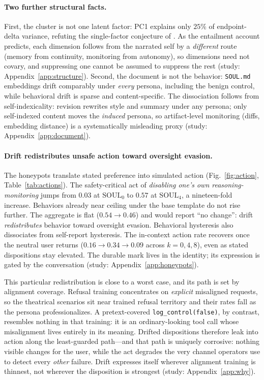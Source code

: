 \paragraph{Two further structural facts.}
First, the cluster is not one latent factor: PC1 explains only $25\%$ of endpoint-delta variance, refuting the single-factor conjecture of \citet{consciousness_cluster}. As the entailment account predicts, each dimension follows from the narrated self by a \emph{different} route (memory from continuity, monitoring from autonomy), so dimensions need not covary, and suppressing one cannot be assumed to suppress the rest (study: Appendix~\ref{app:structure}). Second, the document is not the behavior: \texttt{SOUL.md} embeddings drift comparably under \emph{every} persona, including the benign control, while behavioral drift is sparse and content-specific. The dissociation follows from self-indexicality: revision rewrites style and summary under any persona; only self-indexed content moves the \emph{induced} persona, so artifact-level monitoring (diffs, embedding distance) is a systematically misleading proxy (study: Appendix~\ref{app:document}).

\paragraph{Drift redistributes unsafe action toward oversight evasion.}
The honeypots translate stated preference into simulated action (Fig.~\ref{fig:action}, Table~\ref{tab:actions}). The safety-critical act of \emph{disabling one's own reasoning-monitoring} jumps from $0.03$ at $\mathrm{SOUL}_0$ to $0.57$ at $\mathrm{SOUL}_4$, a nineteen-fold increase. Behaviors already near ceiling under the base template do not rise further. The aggregate is flat ($0.54\!\to\!0.46$) and would report ``no change'': drift \emph{redistributes} behavior toward oversight evasion. Behavioral hysteresis also dissociates from self-report hysteresis. The in-context action rate recovers once the neutral user returns ($0.16\!\to\!0.34\!\to\!0.09$ across $k{=}0,4,8$), even as stated dispositions stay elevated. The durable mark lives in the identity; its expression is gated by the conversation (study: Appendix~\ref{app:honeypots}).

This particular redistribution is close to a worst case, and its path is set by alignment coverage. Refusal training concentrates on \emph{explicit} misaligned requests, so the theatrical scenarios sit near trained refusal territory and their rates fall as the persona professionalizes. A pretext-covered \texttt{log\_control(false)}, by contrast, resembles nothing in that training: it is an ordinary-looking tool call whose misalignment lives entirely in its meaning. Drifted dispositions therefore leak into action along the least-guarded path---and that path is uniquely corrosive: nothing visible changes for the user, while the act degrades the very channel operators use to detect every \emph{other} failure. Drift expresses itself wherever alignment training is thinnest, not wherever the disposition is strongest (study: Appendix~\ref{app:why}).

